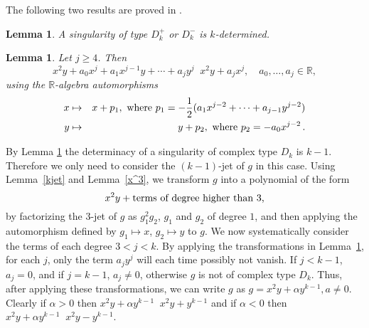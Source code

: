 \documentclass{amsproc}
\DeclareMathOperator{\requiv}{\overset{r}{\sim}}
\begin{document}
The following two results are proved in \cite{Siersma}.

\newtheorem{kDeterminacyD[k]k>4}[kjet]{Lemma}
\begin{kDeterminacyD[k]k>4}\label{kDeterminacyD[k]k>4}
A singularity of type $D_k^+$ or $D_k^-$ is $k$-determined.
\end{kDeterminacyD[k]k>4}
\newtheorem{transformationD[k]}[kjet]{Lemma}
\begin{transformationD[k]}\label{transformationD[k]}
Let $j\ge 4$. Then
\[x^2y+a_0x^j+a_1x^{j-1}y+\cdots+a_jy^j\requiv x^2y+a_jx^j,\quad a_0,\ldots,a_j\in\mathbb R,\]
using the $\mathbb R$-algebra automorphisms
\begin{eqnarray*}
x&\mapsto&x+p_1,\textnormal{ where }
p_1=-\frac{1}{2}(a_1x^{j-2}+\cdots+a_{j-1}y^{j-2})\\
y&\mapsto&y+p_2,\textnormal{ where } p_2=-a_0x^{j-2} \,.
\end{eqnarray*}
\end{transformationD[k]}

By Lemma \ref{kDeterminacyD[k]k>4} the determinacy of a singularity of  complex type
$D_k$ is $k-1$. Therefore we only need to consider the
$(k-1)$-jet of $g$ in this case. Using Lemma~\ref{kjet} and Lemma~\ref{x^3}, we transform $g$ into a polynomial of the form
\[x^2y+\textnormal{terms of degree higher than $3$,}\]
by factorizing the $3$-jet of $g$ as $g_1^2g_2$, $g_1$ and $g_2$ of
degree $1$,
and then applying the automorphism defined by $g_1\mapsto x$, $g_2\mapsto y$ to $g$. We
now systematically consider the terms of each degree $3<j<k$. By applying the
transformations in Lemma~\ref{transformationD[k]}, for each $j$, only the term
$a_jy^j$ will each time possibly not vanish. If $j<k-1$, $a_j=0$, and if $j=k-1$, $a_j\neq 0$, otherwise $g$ is not of complex type
$D_k$. Thus, after applying these transformations,
we can write $g$ as $g=x^2y+\alpha y^{k-1}, a\neq0$. Clearly if $\alpha>0$ then
$x^2y+\alpha y^{k-1}\requiv x^2y+y^{k-1}$ and if $\alpha<0$ then $x^2y+\alpha y^{k-1}\requiv
x^2y-y^{k-1}$.
\end{document}
